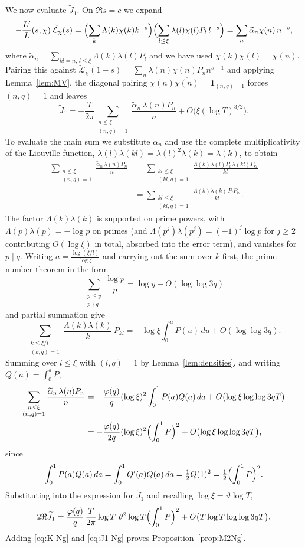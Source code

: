 \documentclass[10pt,a4paper]{amsart}
\numberwithin{equation}{section}
\begin{document}
We now evaluate $\widetilde J_1$. On $\Re s=c$ we expand
\[
-\frac{L'}{L}(s,\chi)\,\widetilde{\mathcal L}_\chi(s)=\Bigl(\sum_k\Lambda(k)\chi(k)k^{-s}\Bigr)\Bigl(\sum_{l\le\xi}\lambda(l)\chi(l)P_l\,l^{-s}\Bigr)=\sum_n\widetilde\alpha_n\chi(n)\,n^{-s},
\]
where $\widetilde\alpha_n=\sum_{kl=n,\,l\le\xi}\Lambda(k)\lambda(l)P_l$ and we have used $\chi(k)\chi(l)=\chi(n)$. Pairing this against $\widetilde{\mathcal L}_{\bar\chi}(1-s)=\sum_n\lambda(n)\bar\chi(n)P_n n^{s-1}$ and applying Lemma~\ref{lem:MV}, the diagonal pairing $\chi(n)\overline{\chi(n)}=\mathbf 1_{(n,q)=1}$ forces $(n,q)=1$ and leaves
\[
\widetilde J_1=-\frac{T}{2\pi}\sum_{\substack{n\le\xi\\(n,q)=1}}\frac{\widetilde\alpha_n\,\lambda(n)P_n}{n}+O\bigl(\xi(\log T)^{3/2}\bigr).
\]
To evaluate the main sum we substitute $\widetilde\alpha_n$ and use the complete multiplicativity of the Liouville function, $\lambda(l)\lambda(kl)=\lambda(l)^2\lambda(k)=\lambda(k)$, to obtain
\[
\begin{aligned}
\sum_{\substack{n\le\xi\\(n,q)=1}}\frac{\widetilde\alpha_n\,\lambda(n)P_n}{n}
&=\sum_{\substack{kl\le\xi\\(kl,q)=1}}\frac{\Lambda(k)\lambda(l)P_l\,\lambda(kl)P_{kl}}{kl}\\
&=\sum_{\substack{kl\le\xi\\(kl,q)=1}}\frac{\Lambda(k)\lambda(k)\,P_l P_{kl}}{kl}.
\end{aligned}
\]
The factor $\Lambda(k)\lambda(k)$ is supported on prime powers, with $\Lambda(p)\lambda(p)=-\log p$ on primes (and $\Lambda(p^j)\lambda(p^j)=(-1)^j\log p$ for $j\ge2$ contributing $O(\log\xi)$ in total, absorbed into the error term), and vanishes for $p\mid q$. Writing $a=\frac{\log(\xi/l)}{\log\xi}$ and carrying out the sum over $k$ first, the prime number theorem in the form
\[
\sum_{\substack{p\le y\\ p\nmid q}}\frac{\log p}{p}=\log y+O(\log\log 3q)
\]
and partial summation give
\[
\sum_{\substack{k\le\xi/l\\(k,q)=1}}\frac{\Lambda(k)\lambda(k)}{k}\,P_{kl}=-\log\xi\int_0^a P(u)\,du+O(\log\log 3q).
\]
Summing over $l\le\xi$ with $(l,q)=1$ by Lemma~\ref{lem:densities}, and writing $Q(a)=\int_0^a P$,
\[
\begin{aligned}
\sum_{\substack{n\le\xi\\(n,q)=1}}\frac{\widetilde\alpha_n\,\lambda(n)P_n}{n}
&=-\frac{\varphi(q)}{q}(\log\xi)^2\int_0^1 P(a)Q(a)\,da+O\bigl(\log\xi\log\log 3qT\bigr)\\
&=-\frac{\varphi(q)}{2q}(\log\xi)^2\Bigl(\int_0^1 P\Bigr)^2+O\bigl(\log\xi\log\log 3qT\bigr),
\end{aligned}
\]
since
\[
\int_0^1 P(a)Q(a)\,da=\int_0^1 Q'(a)Q(a)\,da=\tfrac12 Q(1)^2=\tfrac12\Bigl(\int_0^1 P\Bigr)^2.
\]
Substituting into the expression for $\widetilde J_1$ and recalling $\log\xi=\vartheta\log T$,
\begin{equation}\label{eq:J1-Ng}
2\Re\widetilde J_1=\frac{\varphi(q)}{q}\,\frac{T}{2\pi}\log T\;\vartheta^2\log T\Bigl(\int_0^1 P\Bigr)^2+O\bigl(T\log T\log\log 3qT\bigr).
\end{equation}
Adding \eqref{eq:K-Ng} and \eqref{eq:J1-Ng} proves Proposition~\ref{prop:M2Ng}.
\end{document}
